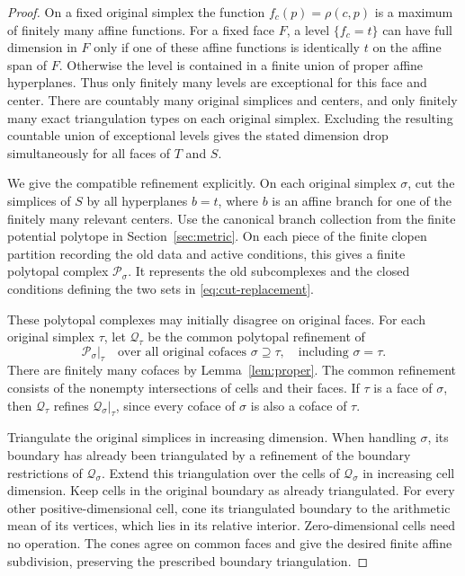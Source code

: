 \begin{proof}
On a fixed original simplex the function
$f_c(p)=\rho(c,p)$ is a maximum of finitely many affine functions.
For a fixed face $F$, a level $\{f_c=t\}$ can have full dimension in
$F$ only if one of these affine functions is identically $t$ on the
affine span of $F$.  Otherwise the level is contained in a finite
union of proper affine hyperplanes.  Thus only finitely many levels
are exceptional for this face and center.  There are countably many
original simplices and centers, and only finitely many exact
triangulation types on each original simplex.  Excluding the
resulting countable union of exceptional levels gives the stated
dimension drop simultaneously for all faces of $T$ and $S$.

We give the compatible refinement explicitly.  On each original
simplex $\sigma$, cut the simplices of $S$ by all hyperplanes $b=t$,
where $b$ is an affine branch for one of the finitely many relevant
centers.  Use the
canonical branch collection from the finite potential polytope in
Section~\ref{sec:metric}.  On each piece of the finite clopen partition
recording the old data and active conditions, this gives a finite
polytopal complex $\mathcal P_\sigma$.  It represents the old
subcomplexes and the closed conditions defining the two sets in
\eqref{eq:cut-replacement}.

These polytopal complexes may initially disagree on original faces.
For each original simplex $\tau$, let $\mathcal Q_\tau$ be the common
polytopal refinement of
\[
 \mathcal P_\sigma|_\tau
 \quad\text{over all original cofaces }\sigma\supseteq\tau,
 \quad\text{including }\sigma=\tau.
\]
There are finitely many cofaces by Lemma~\ref{lem:proper}.
The common refinement consists of the nonempty intersections of cells
and their faces.  If $\tau$ is a face of $\sigma$, then
$\mathcal Q_\tau$ refines $\mathcal Q_\sigma|_\tau$, since every coface
of $\sigma$ is also a coface of $\tau$.

Triangulate the original simplices in increasing dimension.  When
handling $\sigma$, its boundary has already been triangulated by a
refinement of the boundary restrictions of $\mathcal Q_\sigma$.
Extend this triangulation over the cells of $\mathcal Q_\sigma$ in
increasing cell dimension.  Keep cells in the original boundary as
already triangulated.  For every other positive-dimensional cell,
cone its triangulated boundary to the arithmetic mean of its vertices,
which lies in its relative interior.  Zero-dimensional cells need no
operation.  The cones agree on common faces and give the desired finite
affine subdivision, preserving the prescribed boundary triangulation.


\end{proof}
